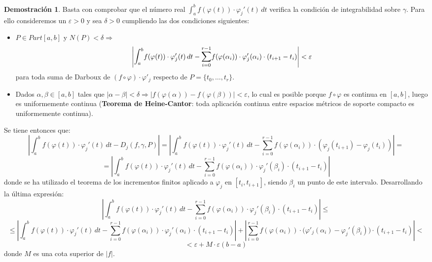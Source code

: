 \documentclass[12pt,twoside]{report}
\newcommand{\bint}{\mathlarger{\int}}
\theoremstyle{azul}
\theoremstyle{azul2}
\theoremstyle{plain}
\theoremstyle{definition}
\newtheorem*{dem}{Demostración}
\theoremstyle{remark}
\begin{document}
\begin{dem}
Basta con comprobar que el número real $\int_a^b f(\varphi(t))\cdot \varphi_j'(t)\, dt$ verifica la condición de integrabilidad sobre $\gamma$. Para ello consideremos un $\varepsilon>0$ y sea $\delta>0$ cumpliendo las dos condiciones siguientes: \vspace{-3mm}
\begin{itemize} 
    \item $P\in Part[a,b]$ y $N(P)<\delta \Rightarrow$ $$\left|\bint_a^b f(\varphi(t))\cdot \varphi_j'(t) \, dt - \mathlarger{\sum}_{i=0}^{r-1} f(\varphi(\alpha_i))\cdot \varphi_j'(\alpha_i)\cdot (t_{i+1}-t_i)\right| < \varepsilon$$
    para toda suma de Darboux de $(f\circ\varphi)\cdot \varphi'_j$ respecto de $P=\{t_0,\ldots,t_r\}$.
    \item Dados $\alpha, \beta\in [a,b]$ tales que $|\alpha - \beta|<\delta \Rightarrow |f(\varphi(\alpha))-f(\varphi(\beta))|<\varepsilon$, lo cual es posible porque $f\circ \varphi$ es continua en $[a,b]$, luego es uniformemente continua (\textbf{Teorema de Heine-Cantor}: toda aplicación continua entre espacios métricos de soporte compacto es uniformemente continua).
\end{itemize}
Se tiene entonces que:
$$\left| \int_a^b f(\varphi(t))\cdot \varphi_j'(t) \, dt - D_j(f,\gamma, P)\right|=\left| \int_a^b f(\varphi(t))\cdot \varphi_j'(t) \, dt -\sum_{i=0}^{r-1} f(\varphi(\alpha_i))\cdot (\varphi_j(t_{i+1})-\varphi_j(t_i))\right|=$$
$$=\left| \int_a^b f(\varphi(t))\cdot \varphi_j'(t) \, dt -\sum_{i=0}^{r-1} f(\varphi(\alpha_i))\cdot \varphi_j'(\beta_i)\cdot (t_{i+1}-t_i)\right|$$
donde se ha utilizado el teorema de los incrementos finitos aplicado a $\varphi_j$ en $[t_i,t_{i+1}]$, siendo $\beta_i$ un punto de este intervalo. Desarrollando la última expresión:
$$\left| \int_a^b f(\varphi(t))\cdot \varphi_j'(t) \, dt -\sum_{i=0}^{r-1} f(\varphi(\alpha_i))\cdot \varphi_j'(\beta_i)\cdot (t_{i+1}-t_i)\right|\leq$$
$$\leq\left| \int_a^b f(\varphi(t))\cdot \varphi_j'(t) \, dt -\sum_{i=0}^{r-1} f(\varphi(\alpha_i))\cdot \varphi_j'(\alpha_i)\cdot (t_{i+1}-t_i)\right|+\left|\sum_{i=0}^{r-1} f(\varphi(\alpha_i))\cdot \big(\varphi'_j(\alpha_i)-\varphi_j'(\beta_i)\big)\cdot (t_{i+1}-t_i)\right|<$$
$$<\varepsilon+M\cdot \varepsilon(b-a)$$
donde $M$ es una cota superior de $|f|$.
\end{dem}
\end{document}
